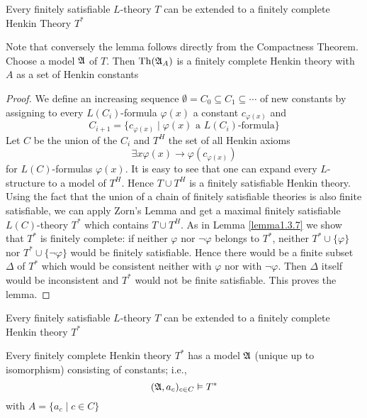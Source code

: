 \documentclass[11pt]{article}
\begin{document}
\begin{lemma}[]
Every finitely satisfiable \(L\)-theory \(T\) can be extended to a finitely
complete Henkin Theory \(T^*\)
\end{lemma}

Note that conversely the lemma follows directly from the Compactness Theorem. Choose a
model \(\mathfrak{A}\) of \(T\). Then \(\operatorname{Th}(\mathfrak{A}_A)\) is a finitely complete Henkin theory with \(A\) as a set
of Henkin constants

\begin{proof}
We define an increasing sequence \(\emptyset=C_0\subseteq C_1\subseteq\cdots\) of new constants by assigning to
every \(L(C_i)\)-formula \(\varphi(x)\) a constant \(c_{\varphi(x)}\) and
\begin{equation*}
C_{i+1}=\{c_{\varphi(x)}\mid \varphi(x)\text{ a }L(C_i)\text{-formula}\}
\end{equation*}
Let \(C\) be the union of the \(C_i\) and \(T^H\) the set of all Henkin axioms
\begin{equation*}
\exists x\varphi(x)\to\varphi(c_{\varphi(x)})
\end{equation*}
for \(L(C)\)-formulas \(\varphi(x)\). It is easy to see that one can expand every \(L\)-structure to a
model of \(T^H\). Hence \(T\cup T^H\) is a finitely satisfiable Henkin theory. Using the fact that the
union of a chain of finitely satisfiable theories is also finite satisfiable, we can apply Zorn's
Lemma and get a maximal finitely satisfiable \(L(C)\)-theory \(T^*\) which contains \(T\cup T^H\). As
in Lemma \ref{lemma1.3.7} we show that \(T^*\) is finitely complete: if neither \(\varphi\) nor \(\neg\varphi\)
belongs to \(T^*\), neither \(T^*\cup\{\varphi\}\) nor \(T^*\cup\{\neg\varphi\}\) would be finitely satisfiable. Hence
there would be a finite subset \(\Delta\) of \(T^*\) which would be consistent neither with \(\varphi\) nor
with \(\neg\varphi\). Then \(\Delta\) itself would be inconsistent and \(T^*\) would not be finite satisfiable.
This proves the lemma.
\end{proof}

\begin{lemma}[]
\label{lemma2.2.3}
Every finitely satisfiable \(L\)-theory \(T\) can be extended to a finitely
complete Henkin theory \(T^*\)
\end{lemma}

\begin{lemma}[]
Every finitely complete Henkin theory \(T^*\) has a model \(\mathfrak{A}\) (unique up
to isomorphism) consisting of constants; i.e.,
\begin{equation*}
(\mathfrak{A},a_c)_{c\in C}\vDash T^*
\end{equation*}
with \(A=\{a_c\mid c\in C\}\)
\end{lemma}
\end{document}
